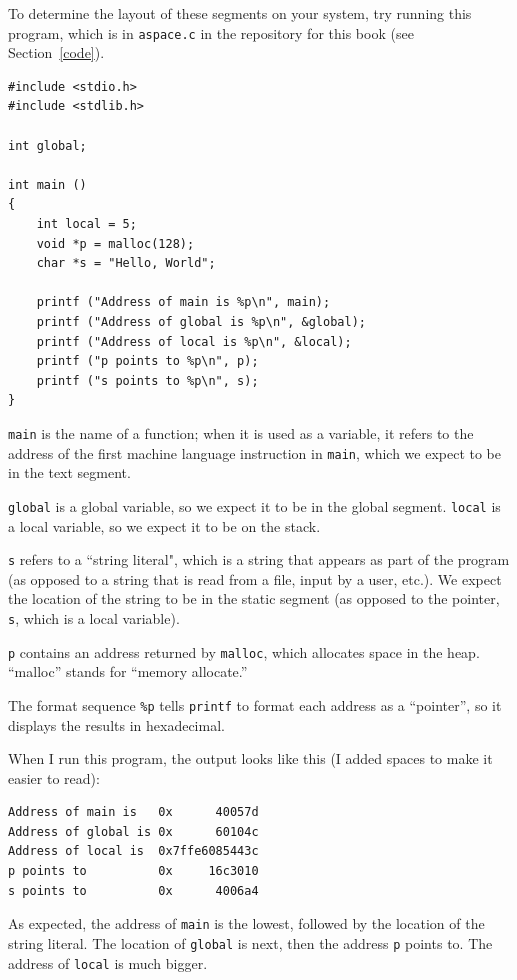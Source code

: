 \documentclass[12pt]{book}
\begin{document}
{To determine the layout of these segments on your system, try running
this program, which is in {\tt aspace.c} in the repository for this
book (see Section~\ref{code}).

\begin{verbatim}
#include <stdio.h>
#include <stdlib.h>

int global;

int main ()
{
    int local = 5;
    void *p = malloc(128);
    char *s = "Hello, World";

    printf ("Address of main is %p\n", main);
    printf ("Address of global is %p\n", &global);
    printf ("Address of local is %p\n", &local);
    printf ("p points to %p\n", p);
    printf ("s points to %p\n", s);
}
\end{verbatim}

{\tt main} is the name of a function; when it is used as a variable,
it refers to the address of the first machine language instruction
in {\tt main}, which we expect to be in the text segment.

{\tt global} is a global variable, so we expect it to be in the
global segment.  {\tt local} is a local variable, so we expect it
to be on the stack.

{\tt s} refers to a ``string literal", which is a string that appears
as part of the program (as opposed to a string that is read from a file,
input by a user, etc.).  We expect the location of the string to be
in the static segment (as opposed to the pointer, {\tt s}, which is
a local variable).

{\tt p} contains an address returned by {\tt malloc}, which allocates
space in the heap.  ``malloc'' stands for ``memory allocate.''

The format sequence \verb"%p" tells {\tt printf} to format each
address as a ``pointer'', so it displays the results in hexadecimal.

When I run this program, the output looks like this (I added spaces
to make it easier to read):

\begin{verbatim}
Address of main is   0x      40057d
Address of global is 0x      60104c
Address of local is  0x7ffe6085443c
p points to          0x     16c3010
s points to          0x      4006a4

\end{verbatim}

As expected, the address of {\tt main} is the lowest, followed by
the location of the string literal.  The location of
{\tt global} is next, then the address {\tt p} points to.
The address of {\tt local} is much bigger.

}
\end{document}
